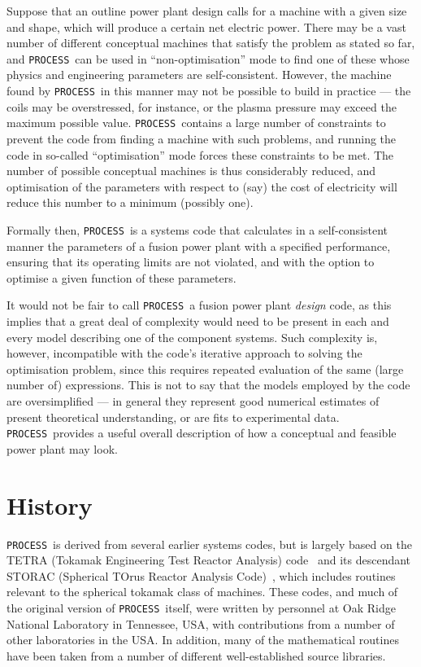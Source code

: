 \documentclass[11pt,a4paper]{report}
\newcommand{\process}{\mbox{\texttt{PROCESS}}}
\begin{document}
Suppose that an outline power plant design calls for a machine with a given
size and shape, which will produce a certain net electric power.  There may be
a vast number of different conceptual machines that satisfy the problem as
stated so far, and \process\ can be used in ``non-optimisation'' mode to find
one of these whose physics and engineering parameters are
self-consistent. However, the machine found by \process\ in this manner may
not be possible to build in practice --- the coils may be overstressed, for
instance, or the plasma pressure may exceed the maximum possible
value. \process\ contains a large number of constraints to prevent the code
from finding a machine with such problems, and running the code in so-called
``optimisation'' mode forces these constraints to be met. The number of
possible conceptual machines is thus considerably reduced, and optimisation of
the parameters with respect to (say) the cost of electricity will reduce this
number to a minimum (possibly one).

Formally then, \process\ is a systems code that calculates in a
self-consistent manner the parameters of a fusion power plant with a specified
performance, ensuring that its operating limits are not violated, and with the
option to optimise a given function of these parameters.

It would not be fair to call \process\ a fusion power plant \textit{design}\/
code, as this implies that a great deal of complexity would need to be present
in each and every model describing one of the component systems. Such
complexity is, however, incompatible with the code's iterative approach to
solving the optimisation problem, since this requires repeated evaluation of
the same (large number of) expressions. This is not to say that the models
employed by the code are oversimplified --- in general they represent good
numerical estimates of present theoretical understanding, or are fits to
experimental data. \process\ provides a useful overall description of how a
conceptual and feasible power plant may look.

\section{History}

\process\ is derived from several earlier systems codes, but is largely based
on the TETRA (Tokamak Engineering Test Reactor Analysis) code~\cite{tetra} and
its descendant STORAC (Spherical TOrus Reactor Analysis Code)~\cite{storac},
which includes routines relevant to the spherical tokamak class of
machines. These codes, and much of the original version of \process\ itself,
were written by personnel at Oak Ridge National Laboratory in Tennessee, USA,
with contributions from a number of other laboratories in the USA\@. In
addition, many of the mathematical routines have been taken from a number of
different well-established source libraries.
\end{document}
